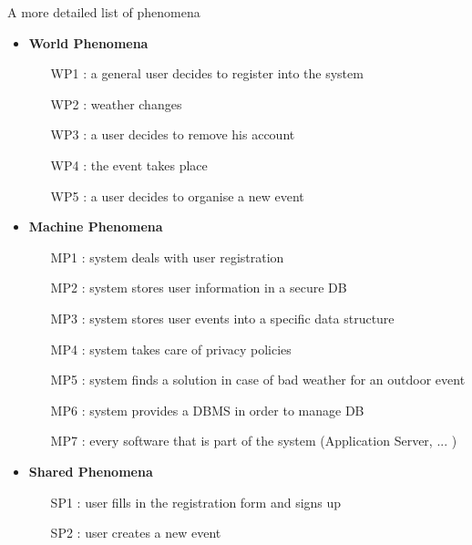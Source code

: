 \documentclass[12pt]{book}
\begin{document}
A more detailed list of phenomena

\begin{itemize}
	\item \textbf{World Phenomena} 
		\begin{enumerate}
			\item [WP1] : a general user decides to register into the system\\  
			\item [WP2] : weather changes \\
			\item [WP3] : a user decides to remove his account\\
			\item [WP4] : the event takes place \\
			\item [WP5] : a user decides to organise a new event \\
		\end{enumerate}
	\item \textbf{Machine Phenomena}
		\begin{enumerate}
			\item [MP1] : system deals with user registration\\  
			\item [MP2] : system stores user information in a secure DB\\
			\item [MP3] : system stores user events into a specific data structure \\
			\item [MP4] : system takes care of privacy policies  \\
			\item [MP5] : system finds a solution in case of bad weather for an outdoor event \\
			\item [MP6] : system provides a DBMS in order to manage DB\\
			\item [MP7] : every software that is part of the system (Application Server, ... ) \\
		\end{enumerate}
	\item \textbf{Shared Phenomena}
		\begin{enumerate}
			\item [SP1] : user fills in the registration form and signs up \\
			\item [SP2] : user creates a new event\\

\end{enumerate}
\end{itemize}
\end{document}
